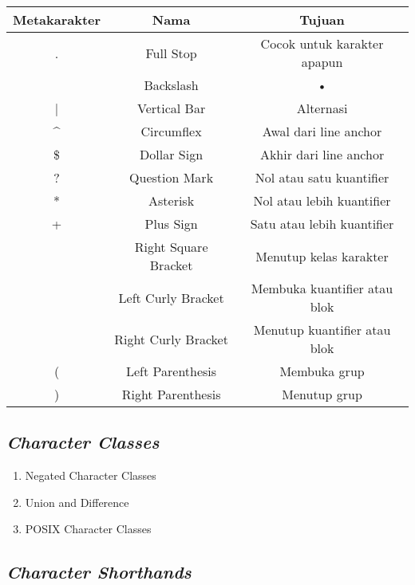 \begin{tabular}{|c|c|c|}
\hline 
Metakarakter & Nama & Tujuan \\ 
\hline 
. & Full Stop & Cocok untuk karakter apapun \\ 
\hline 
\ & Backslash & • \\ 
\hline 
| & Vertical Bar & Alternasi  \\ 
\hline 
^ & Circumflex & Awal dari line anchor \\ 
\hline 
\$ & Dollar Sign & Akhir dari line anchor \\ 
\hline 
? & Question Mark & Nol atau satu kuantifier \\ 
\hline 
* & Asterisk & Nol atau lebih kuantifier \\ 
\hline 
+ & Plus Sign & Satu atau lebih kuantifier \\ 
\hline 
[ & Left Square Bracket & Membuka kelas karakter\\ 
\hline 
] & Right Square Bracket & Menutup kelas karakter \\ 
\hline 
{ & Left Curly Bracket & Membuka kuantifier atau blok \\ 
\hline 
} & Right Curly Bracket & Menutup kuantifier atau blok \\ 
\hline 
( & Left Parenthesis & Membuka grup \\ 
\hline 
) & Right Parenthesis & Menutup grup \\ 
\hline 
\end{tabular} 

\subsection{\textit{Character Classes}}
\begin{enumerate}
	\item Negated Character Classes
	\item Union and Difference
	\item POSIX Character Classes
\end{enumerate}

\subsection{\textit{Character Shorthands}}

